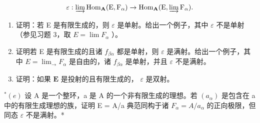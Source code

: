\[
\varepsilon : \varinjlim \operatorname{Hom} _ {\mathbf {A}} (\mathrm{E}, \mathrm{F} _ {\alpha}) \rightarrow \operatorname{Hom} _ {\mathbf {A}} (\mathrm{E}, \varinjlim \mathrm{F} _ {\alpha}).
\]

\begin{enumerate}
\def\labelenumi{(\alph{enumi})}
\setcounter{enumi}{1}
\item
  证明：若 E 是有限生成的，则 \(\varepsilon\) 是单射。给出一个例子，其中 \(\varepsilon\) 不是单射（参见习题 3，取 \(E = \lim F_{\alpha}\) ）。
\item
  证明若 E 是有限生成的且诸 \(f_{\beta\alpha}\) 都是单射，则 \(\varepsilon\) 是满射。给出一个例子，其中 \(E = \lim_{\longrightarrow} F_{\alpha}\) 是自由的，诸 \(f_{\beta\alpha}\) 是单射，并且 \(\varepsilon\) 不是满射。
\item
  证明：如果 \(\mathbf{E}\) 是投射的且有限生成的， \(\varepsilon\) 是双射。
\end{enumerate}

\(^{*}(e)\) 设 A 是一个整环，a 是 A 的一个非有限生成的理想。若 \((a_{\alpha})\) 是包含在 a 中的有限生成理想的族，证明 E = A/a 典范同构于诸 \(F_{\alpha} = A/a_{\alpha}\) 的正向极限，但同态 \(\varepsilon\) 不是满射。*
